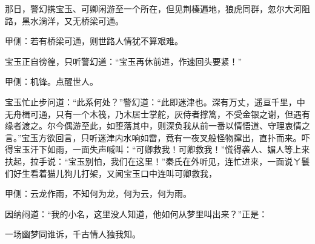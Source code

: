 \begin{parag}
    那日，警幻携宝玉、可卿闲游至一个所在，但见荆榛遍地，狼虎同群，忽尔大河阻路，黑水淌洋，又无桥梁可通。\begin{note}甲侧：若有桥梁可通，则世路人情犹不算艰难。\end{note}宝玉正自徬徨，只听警幻道：“宝玉再休前进，作速回头要紧！”\begin{note}甲侧：机锋。点醒世人。\end{note}宝玉忙止步问道：“此系何处？”警幻道：“此即迷津也。深有万丈，遥亘千里，中无舟楫可通，只有一个木筏，乃木居士掌舵，灰侍者撑篙，不受金银之谢，但遇有缘者渡之。尔今偶游至此，如堕落其中，则深负我从前一番以情悟道、守理衷情之言。”宝玉方欲回言，只听迷津内水响如雷，竟有一夜叉般怪物撺出，直扑而来。吓得宝玉汗下如雨，一面失声喊叫：“可卿救我！可卿救我！”慌得袭人、媚人等上来扶起，拉手说：“宝玉别怕，我们在这里！”秦氏在外听见，连忙进来，一面说ㄚ鬟们好生看着猫儿狗儿打架，又闻宝玉口中连叫可卿救我，\begin{note}甲侧：云龙作雨，不知何为龙，何为云，何为雨。\end{note}因纳闷道：“我的小名，这里没人知道，他如何从梦里叫出来？”正是：
\end{parag}


\begin{poem}
    \begin{pl}一场幽梦同谁诉，千古情人独我知。\end{pl}
\end{poem}

